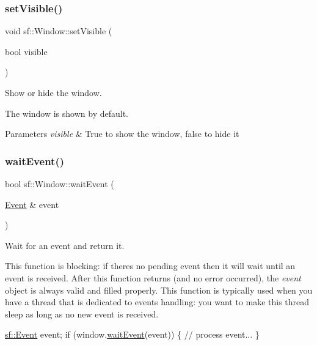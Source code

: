 \subsubsection{\texorpdfstring{set\+Visible()}{setVisible()}}
{\footnotesize\ttfamily void sf\+::\+Window\+::set\+Visible (\begin{DoxyParamCaption}\item[{bool}]{visible }\end{DoxyParamCaption})}



Show or hide the window. 

The window is shown by default.


\begin{DoxyParams}{Parameters}
{\em visible} & True to show the window, false to hide it \\
\hline
\end{DoxyParams}
\mbox{\label{classsf_1_1_window_aaf02ab64fbc1d374eef3696df54137bc}} 
\subsubsection{\texorpdfstring{wait\+Event()}{waitEvent()}}
{\footnotesize\ttfamily bool sf\+::\+Window\+::wait\+Event (\begin{DoxyParamCaption}\item[{\hyperlink{classsf_1_1_event}{Event} \&}]{event }\end{DoxyParamCaption})}



Wait for an event and return it. 

This function is blocking\+: if there\textquotesingle{}s no pending event then it will wait until an event is received. After this function returns (and no error occurred), the {\itshape event} object is always valid and filled properly. This function is typically used when you have a thread that is dedicated to events handling\+: you want to make this thread sleep as long as no new event is received. 
\begin{DoxyCode}
\hyperlink{classsf_1_1_event}{sf::Event} event;
\textcolor{keywordflow}{if} (window.\hyperlink{classsf_1_1_window_aaf02ab64fbc1d374eef3696df54137bc}{waitEvent}(event))
\{
   \textcolor{comment}{// process event...}
\}
\end{DoxyCode}



